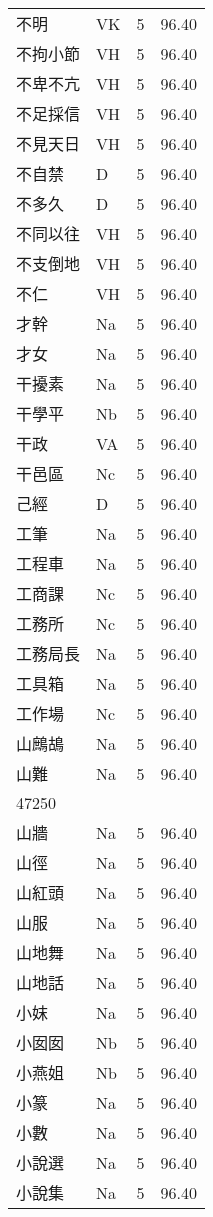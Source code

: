 \documentclass[twocolumn]{book}
\begin{document}
\begin{supertabular}{llrr}
不明 & VK & 5 &  96.40\\
不拘小節 & VH & 5 &  96.40\\
不卑不亢 & VH & 5 &  96.40\\
不足採信 & VH & 5 &  96.40\\
不見天日 & VH & 5 &  96.40\\
不自禁 & D & 5 &  96.40\\
不多久 & D & 5 &  96.40\\
不同以往 & VH & 5 &  96.40\\
不支倒地 & VH & 5 &  96.40\\
不仁 & VH & 5 &  96.40\\
才幹 & Na & 5 &  96.40\\
才女 & Na & 5 &  96.40\\
干擾素 & Na & 5 &  96.40\\
干學平 & Nb & 5 &  96.40\\
干政 & VA & 5 &  96.40\\
干邑區 & Nc & 5 &  96.40\\
己經 & D & 5 &  96.40\\
工筆 & Na & 5 &  96.40\\
工程車 & Na & 5 &  96.40\\
工商課 & Nc & 5 &  96.40\\
工務所 & Nc & 5 &  96.40\\
工務局長 & Na & 5 &  96.40\\
工具箱 & Na & 5 &  96.40\\
工作場 & Nc & 5 &  96.40\\
山鷓鴣 & Na & 5 &  96.40\\
山難 & Na & 5 &  96.40\\
47250\\
山牆 & Na & 5 &  96.40\\
山徑 & Na & 5 &  96.40\\
山紅頭 & Na & 5 &  96.40\\
山服 & Na & 5 &  96.40\\
山地舞 & Na & 5 &  96.40\\
山地話 & Na & 5 &  96.40\\
小妺 & Na & 5 &  96.40\\
小囡囡 & Nb & 5 &  96.40\\
小燕姐 & Nb & 5 &  96.40\\
小篆 & Na & 5 &  96.40\\
小數 & Na & 5 &  96.40\\
小說選 & Na & 5 &  96.40\\
小說集 & Na & 5 &  96.40\\

\end{supertabular}
\end{document}
